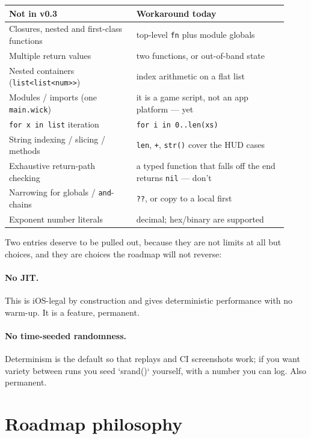 \begin{center}
\begin{tabular}{@{}p{0.42\linewidth}p{0.50\linewidth}@{}}
\toprule
\textbf{Not in v0.3} & \textbf{Workaround today} \\
\midrule
Closures, nested and first-class functions & top-level \texttt{fn} plus module globals \\
Multiple return values & two functions, or out-of-band state \\
Nested containers (\texttt{list<list<num>>}) & index arithmetic on a flat list \\
Modules / imports (one \texttt{main.wick}) & it is a game script, not an app platform --- yet \\
\texttt{for x in list} iteration & \texttt{for i in 0..len(xs)} \\
String indexing / slicing / methods & \texttt{len}, \texttt{+}, \texttt{str()} cover the HUD cases \\
Exhaustive return-path checking & a typed function that falls off the end returns \texttt{nil} --- don't \\
Narrowing for globals / \texttt{and}-chains & \texttt{??}, or copy to a local first \\
Exponent number literals & decimal; hex/binary are supported \\
\bottomrule
\end{tabular}
\end{center}

\noindent
Two entries deserve to be pulled out, because they are not limits at all but
choices, and they are choices the roadmap will not reverse:

\paragraph{No JIT.} This is iOS-legal by construction and gives deterministic
performance with no warm-up. It is a feature, permanent.

\paragraph{No time-seeded randomness.} Determinism is the default so that
replays and CI screenshots work; if you want variety between runs you seed
`srand()` yourself, with a number you can log. Also permanent.

\section{Roadmap philosophy}

